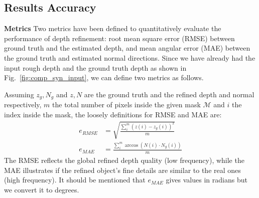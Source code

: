 \subsection{Results Accuracy}
\textbf{Metrics}
Two metrics have been defined to quantitatively evaluate the performance of depth refinement: root mean square error (RMSE) between ground truth and the estimated depth, and mean angular error (MAE) between the ground truth and estimated normal directions.
Since we have already had the input rough depth and the ground truth depth as shown in Fig.~\ref{fig:comp_syn_input}, we can define two metrics as follows.

Assuming $z_g, N_g$ and $z, N$ are the ground truth and the refined depth and normal respectively, $m$ the total number of pixels inside the given mask $\mathcal{M}$ and $i$ the index inside the mask, the loosely definitions for RMSE and MAE are: 
\begin{align}
    e_{RMSE} &= \sqrt{\frac{\sum\limits_{i}^{m}{(z(i) - z_g(i))^2}}{m}}\\
    e_{MAE} &= \frac{\sum\limits_{i}^{m} \arccos (N(i) \cdot N_g(i))}{m}
\end{align}
The RMSE reflects the global refined depth quality (low frequency), while the MAE illustrates if the refined object's fine details are similar to the real ones (high frequency). 
It should be mentioned that $e_{MAE}$ gives values in radians but we convert it to degrees.

